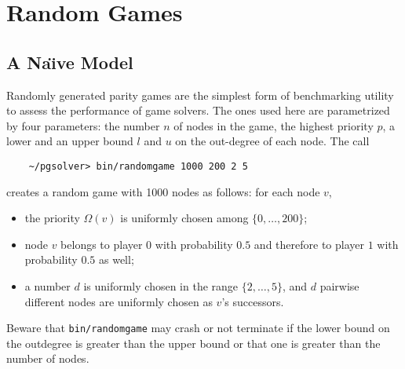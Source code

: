 

%

\section{Random Games}

\subsection{A Na\"{\i}ve Model}
Randomly generated parity games are the simplest form of benchmarking utility to assess the
performance of game solvers. The ones used here are parametrized by four parameters: the number
$n$ of nodes in the game, the highest priority $p$, a lower and an upper bound $l$ and $u$ on the
out-degree of each node. The call
\begin{verbatim}
    ~/pgsolver> bin/randomgame 1000 200 2 5
\end{verbatim}
creates a random game with 1000 nodes as follows: for each node $v$,
\begin{itemize}
\item the priority $\Omega(v)$ is uniformly chosen among $\{0,\ldots,200\}$;
\item node $v$ belongs to player $0$ with probability $0.5$ and therefore to player $1$ with
      probability $0.5$ as well;
\item a number $d$ is uniformly chosen in the range $\{2,\ldots,5\}$, and $d$ pairwise different
      nodes are uniformly chosen as $v$'s successors.
\end{itemize}
Beware that \texttt{bin/randomgame} may crash or not terminate if the lower bound on the outdegree
is greater than the upper bound or that one is greater than the number of nodes.


